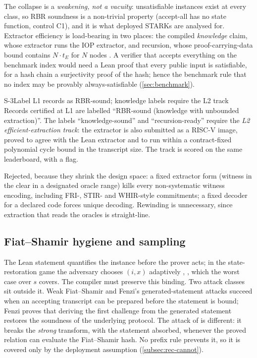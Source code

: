 \noindent The collapse is a \emph{weakening, not a vacuity}: unsatisfiable instances exist at
every class, so RBR soundness is a non-trivial property (accept-all has no state function, control
C1), and it is what deployed STARKs are analysed for. Extractor efficiency is load-bearing in two
places: the compiled \emph{knowledge} claim, whose extractor runs the IOP extractor, and recursion,
whose proof-carrying-data bound contains $N\cdot t_E$ for $N$ nodes \cite{CGSY24}. A verifier that
accepts everything on the benchmark index would need a Lean proof that every public input is
satisfiable, for a hash chain a surjectivity proof of the hash; hence the benchmark rule that no
index may be provably always-satisfiable (\cref{sec:benchmark}).

\begin{decision}{S-3}{Label L1 records as RBR-sound; knowledge labels require the L2 track}
Records certified at L1 are labelled \enquote{RBR-sound (knowledge with unbounded extraction)}.
The labels \enquote{knowledge-sound} and \enquote{recursion-ready} require the \emph{L2
efficient-extraction track}: the extractor is also submitted as a RISC-V image, proved to agree
with the Lean extractor and to run within a contract-fixed polynomial cycle bound in the
transcript size. The track is scored on the same leaderboard, with a flag.
\end{decision}

\noindent Rejected, because they shrink the design space: a fixed extractor form (witness in the
clear in a designated oracle range) kills every non-systematic witness encoding, including
FRI-, STIR- and WHIR-style commitments; a fixed decoder for a declared code forces unique decoding.
Rewinding is unnecessary, since extraction that reads the oracles is straight-line.

\subsection{Fiat--Shamir hygiene and sampling}\label{subsec:sec-fs}

The Lean statement quantifies the instance before the prover acts; in the state-restoration game
the adversary chooses $(i,x)$ adaptively \cite[Defs.~32.4.2, 32.6.4]{CY24-Book},
\cite[Def.~B.1]{BCFW25-WARP}, which the worst case over $s$ covers. The compiler must preserve this
binding. Two attack classes sit outside it. Weak Fiat--Shamir and Fenzi's generated-statement
attacks \cite{BPW12-WeakFS,Fen26-GenR1CS} succeed when an accepting transcript can be prepared
before the statement is bound; Fenzi proves that deriving the first challenge from the generated
statement restores the soundness of the underlying protocol. The attack of \cite{KRS25} is
different: it breaks the \emph{strong} transform, with the statement absorbed, whenever the proved
relation can evaluate the Fiat--Shamir hash. No prefix rule prevents it, so it is covered only by
the deployment assumption  (\cref{subsec:rec-cannot}).

